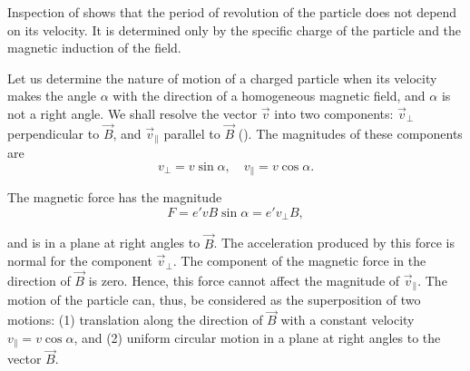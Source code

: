 \noindent
Inspection of  shows that the period of revolution of the particle does not depend on its velocity.
It is determined only by the specific charge of the particle and the magnetic induction of the field.

Let us determine the nature of motion of a charged particle when its velocity makes the angle $\alpha$ with the direction of a homogeneous magnetic field, and $\alpha$ is not a right angle.
We shall resolve the vector $\vec{v}$ into two components: $\vec{v}_{\perp}$ perpendicular to $\vec{B}$, and $\vec{v}_{\parallel}$ parallel to $\vec{B}$ ().
The magnitudes of these components are
\begin{equation*}
    v_{\perp} = v\sin\alpha,\quad v_{\parallel}=v\cos\alpha.
\end{equation*}

The magnetic force has the magnitude
\begin{equation*}
    F = e' v B \sin\alpha = e' v_{\perp} B,
\end{equation*}

\noindent
and is in a plane at right angles to $\vec{B}$.
The acceleration produced by this force is normal for the component $\vec{v}_{\perp}$.
The component of the magnetic force in the direction of $\vec{B}$ is zero.
Hence, this force cannot affect the magnitude of $\vec{v}_{\parallel}$.
The motion of the particle can, thus, be considered as the superposition of two motions: (1) translation along the direction of $\vec{B}$ with a constant velocity $v_{\parallel}=v\cos\alpha$, and (2) uniform circular motion in a plane at right angles to the vector $\vec{B}$.

